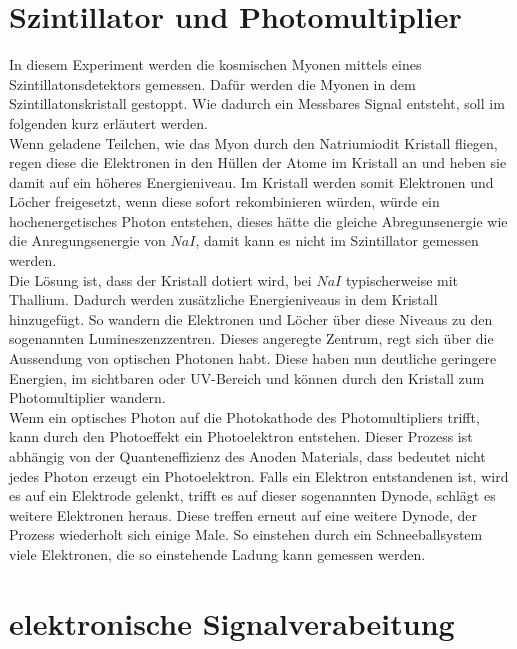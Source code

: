 \documentclass[12pt,a4paper,ngerman]{report}
\begin{document}
	\section{Szintillator und Photomultiplier}
	In diesem Experiment werden die kosmischen Myonen mittels eines Szintillatonsdetektors gemessen. Dafür werden die Myonen in dem  Szintillatonskristall gestoppt. Wie dadurch ein Messbares Signal entsteht, soll im folgenden kurz erläutert werden.\\
	Wenn geladene Teilchen, wie das Myon durch den Natriumiodit Kristall fliegen, regen diese die Elektronen in den Hüllen der Atome im Kristall an und heben sie damit auf ein höheres Energieniveau. Im Kristall werden somit Elektronen und Löcher freigesetzt, wenn diese sofort rekombinieren würden, würde ein hochenergetisches Photon entstehen, dieses hätte die gleiche Abregunsenergie wie die Anregungsenergie von $NaI$, damit kann es nicht im Szintillator gemessen werden.\\
	Die Lösung ist, dass der Kristall dotiert wird, bei $NaI$ typischerweise mit Thallium. Dadurch werden zusätzliche Energieniveaus in dem Kristall hinzugefügt. So wandern die Elektronen und Löcher über diese Niveaus zu den sogenannten Lumineszenzzentren. Dieses angeregte Zentrum, regt sich über die Aussendung von optischen Photonen habt. Diese haben nun deutliche geringere Energien, im sichtbaren oder UV-Bereich und können durch den Kristall zum Photomultiplier wandern.\\
	Wenn ein optisches Photon auf die Photokathode des Photomultipliers trifft, kann durch den Photoeffekt ein Photoelektron entstehen. Dieser Prozess ist abhängig von der Quanteneffizienz des Anoden Materials, dass bedeutet nicht jedes Photon erzeugt ein Photoelektron. Falls ein Elektron entstandenen ist, wird es auf ein Elektrode gelenkt, trifft es auf dieser sogenannten Dynode, schlägt es weitere Elektronen heraus. Diese treffen erneut auf eine weitere Dynode, der Prozess wiederholt sich einige Male. So einstehen durch ein Schneeballsystem viele Elektronen, die so einstehende Ladung kann gemessen werden.  
	
	 
	\section{elektronische Signalverabeitung}
\end{document}
